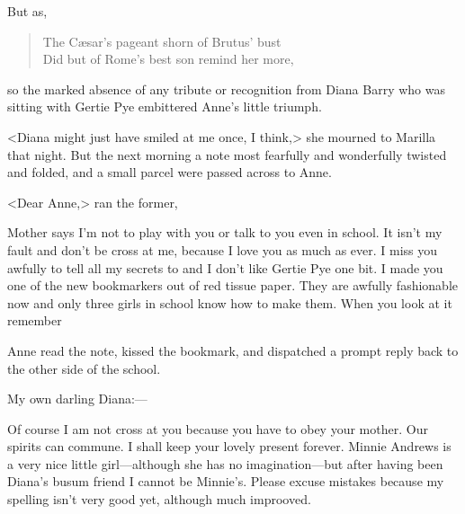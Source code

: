 But as,

\begin{verse}
The Cæsar's pageant shorn of Brutus' bust\\
Did but of Rome's best son remind her more,
\end{verse}

so the marked absence of any tribute or recognition from Diana Barry who was sitting with Gertie Pye embittered Anne's little triumph.

<Diana might just have smiled at me once, I think,> she mourned to Marilla that night. But the next morning a note most fearfully and wonderfully twisted and folded, and a small parcel were passed across to Anne.

<Dear Anne,> ran the former,
\begin{mail}{}{}
Mother says I'm not to play with you or talk to you even in school. It isn't my fault and don't be cross at me, because I love you as much as ever. I miss you awfully to tell all my secrets to and I don't like Gertie Pye one bit. I made you one of the new bookmarkers out of red tissue paper. They are awfully fashionable now and only three girls in school know how to make them. When you look at it remember

\end{mail}

Anne read the note, kissed the bookmark, and dispatched a prompt reply back to the other side of the school.

\begin{mail}{}{My own darling Diana:—}

Of course I am not cross at you because you have to obey your mother. Our spirits can commune. I shall keep your lovely present forever. Minnie Andrews is a very nice little girl—although she has no imagination—but after having been Diana's busum friend I cannot be Minnie's. Please excuse mistakes because my spelling isn't very good yet, although much improoved.

\end{mail}


